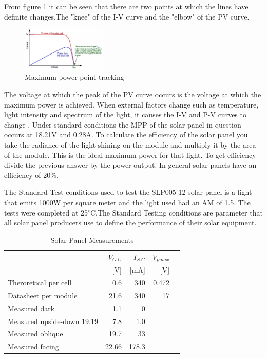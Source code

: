 \label{sec:MPPT}
From figure \ref{fig:mppt} it can be seen that there are two points at which the lines have definite changes.The "knee" of the I-V curve and the "elbow" of the PV curve. 
\begin{figure}
\centering
\includegraphics[width=0.36\textwidth]{Figures/MPPT.png}
\caption{Maximum power point tracking \cite{MPPT}}
\label{fig:mppt}
\end{figure}
The voltage at which the peak of the PV curve occurs is the voltage at which the maximum power is achieved. When external factors change such as temperature, light intensity and spectrum of the light, it causes the I-V and P-V curves to change \cite{vidmppt}. Under standard conditions the MPP of the solar panel in question occurs at 18.21V and 0.28A. To calculate the efficiency of the solar panel you take the radiance of the light shining on the module and multiply it by the area of the module. This is the ideal maximum power for that light. To get efficiency divide the previous answer by the power output. In general solar panels have an efficiency of 20\%\cite{eff}. 



\label{sec:STC}
The Standard Test conditions used to test the SLP005-12 solar panel is a light that emits 1000W per square meter and the light used had an AM of 1.5. The tests were completed at 25$^{\circ}$C.The Standard Testing conditions are parameter that all solar panel producers use to define the performance of their solar equipment.





\begin{table}[!htb]
        \centering
        \footnotesize
        \caption{Solar Panel Measurements}
         \begin{tabular}{lrrrr}
          \toprule
             & $V_{O.C}$ & $I_{S.C}$ & $V_{pmax}$ \\
             &  [V]  & [mA] & [V]\\
          \midrule
          Theroretical per cell & 0.6      & 340 & 0.472 \\
          Datasheet  per module &  21.6      & 340 & 17 \\
          Measured dark       & 1.1 & 0 \\
          Measured upside-down  19.19      & 7.8 & 1.0 \\
          Measured oblique       & 19.7 & 33 \\
          Measured facing        & 22.66 & 178.3 \\
          \bottomrule
        \end{tabular}
     \label{tab:PVresults}
\end{table}

